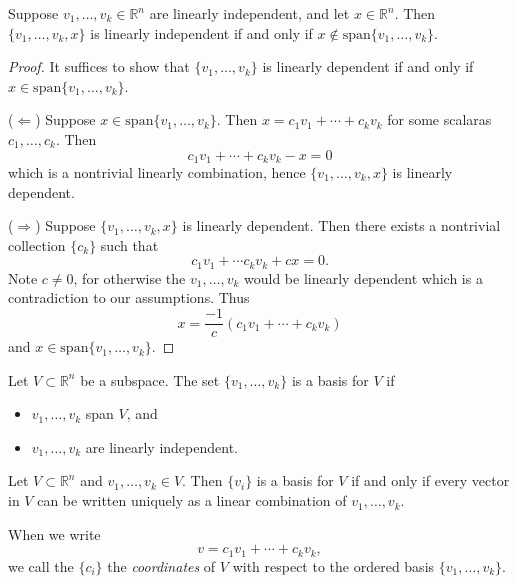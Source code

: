\documentclass[12pt]{article}
\begin{document}
\begin{proposition}
	Suppose $v_1,\dots, v_k\in\mathbb{R}^n$ are linearly independent, and let $x\in\mathbb{R}^n$. Then $\{v_1,\dots,v_k,x\}$ is linearly independent if and only if $x\not\in\text{span}\{v_1,\dots,v_k\}$.
\end{proposition}
\begin{proof} 
	It suffices to show that $\{v_1,\dots,v_k\}$ is linearly dependent if and only if $x\in\text{span}\{v_1,\dots,v_k\}$. 

	($\Leftarrow$) Suppose $x\in\text{span}\{v_1,\dots,v_k\}$. Then $x=c_1v_1+\cdots + c_kv_k$ for some scalaras $c_1,\dots, c_k$. Then 
	\begin{equation*}
		c_1v_1+\cdots +c_kv_k - x = 0
	\end{equation*}
	which is a nontrivial linearly combination, hence $\{v_1,\dots,v_k,x\}$ is linearly dependent.

	($\Rightarrow$) Suppose $\{v_1,\dots,v_k,x\}$ is linearly dependent. Then there exists a nontrivial collection $\{c_k\}$ such that 
	\begin{equation*}
		c_1v_1 + \cdots c_kv_k + cx = 0.
	\end{equation*}
	Note $c\neq 0$, for otherwise the $v_1,\dots,v_k$ would be linearly dependent which is a contradiction to our assumptions. Thus 
	\begin{equation*}
		x = \frac{-1}{c}(c_1v_1 + \cdots + c_kv_k)
	\end{equation*}
	and $x\in\text{span}\{v_1,\dots,v_k\}$.
\end{proof}	

\begin{definition}
	Let $V\subset\mathbb{R}^n$ be a subspace. The set $\{v_1,\dots,v_k\}$ is a basis for $V$ if 
	\begin{itemize}
		\item $v_1,\dots, v_k$ span $V$, and 
		\item $v_1,\dots, v_k$ are linearly independent.
	\end{itemize}
\end{definition}

\begin{corollary}
	Let $V\subset\mathbb{R}^n$ and $v_1,\dots,v_k\in V$. Then $\{v_i\}$ is a basis for $V$ if and only if every vector in $V$ can be written uniquely as a linear combination of $v_1,\dots,v_k$.
\end{corollary}

\begin{definition}
	When we write 
	\begin{equation*}
		v= c_1v_1 + \cdots + c_kv_k,
	\end{equation*}
	we call the $\{c_i\}$ the \emph{coordinates} of $V$ with respect to the ordered basis $\{v_1,\dots,v_k\}$.
\end{definition}
\end{document}
